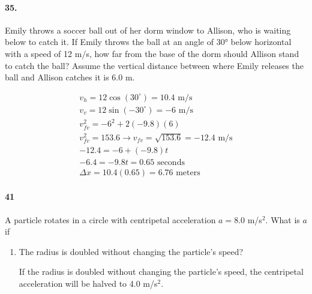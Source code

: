 \begin{multicols*}{2}
        \paragraph*{35.}
        Emily throws a soccer ball out of her dorm window to Allison, who is waiting below to catch it. If Emily throws the ball at an angle of 30° below horizontal with a speed of 12 m/s, how far from the base of the dorm should Allison stand to catch the ball? Assume the vertical distance between where Emily releases the ball and Allison catches it is 6.0 m.

        \begin{mdframed}
            \begin{equation*}
                \begin{gathered}
                    v_h = 12\cos(30^{\circ}) = 10.4 \text{ m/s} \\
                    v_v = 12\sin(-30^{\circ}) = -6 \text{ m/s}  \\
                    v_{fv}^2 = -6^2 + 2(-9.8)(6)                \\
                    v_{fv}^2 = 153.6 \rightarrow v_{fv} = \sqrt{153.6} = -12.4 \text{ m/s}   \\
                    -12.4 = -6 + (-9.8)t    \\
                    -6.4 = -9.8t = 0.65 \text{ seconds} \\
                    \Delta x = 10.4(0.65) = \boxed{6.76 \text{ meters}}
                \end{gathered}
            \end{equation*}
        \end{mdframed}

        \paragraph*{41}
        A particle rotates in a circle with centripetal acceleration $a = 8.0$ m/s$^2$. What is $a$ if

        \begin{enumerate}[label=\alph*.]
            \item The radius is doubled without changing the particle's speed?
            
            \begin{mdframed}
                If the radius is doubled without changing the particle's speed, the centripetal acceleration will be halved to 4.0 m/s$^2$.
            \end{mdframed}


\end{enumerate}
\end{multicols*}
